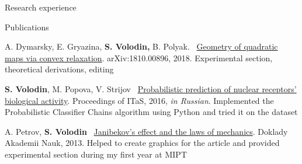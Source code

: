 \documentclass{resume} %
\begin{document}
\begin{rSection}{Research experience}
\end{rSection}

\begin{rSection}{Publications}
\vspace{-1em}
\item A. Dymarsky, E. Gryazina, {\bf S. Volodin,} B. Polyak. \faExternalLink~\href{https://arxiv.org/pdf/1810.00896.pdf}{Geometry of quadratic maps via convex relaxation}. arXiv:1810.00896, 2018. Experimental section, theoretical derivations, editing
\item {\bf S. Volodin}, M. Popova, V. Strijov \faExternalLink~\href{http://itas2016.iitp.ru/pdf/1570303389.pdf}{Probabilistic prediction of nuclear receptors’ biological activity}. Proceedings of ITaS, 2016, {\em in Russian}. Implemented the Probabilistic Classifier Chains algorithm using Python and tried it on the dataset
\item A. Petrov, {\bf S. Volodin} \faExternalLink~\href{https://link.springer.com/article/10.1134/S1028335813080041}{Janibekov's effect and the laws of mechanics}. Doklady Akademii Nauk, 2013. Helped to create graphics for the article and provided experimental section during my first year at MIPT
\end{rSection}
\end{document}
